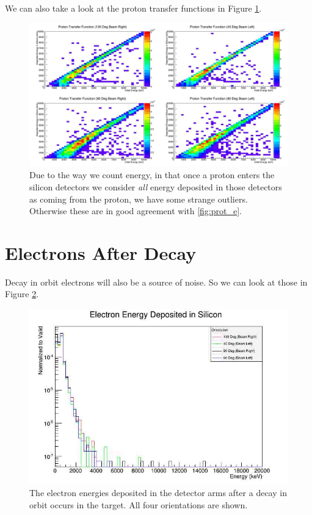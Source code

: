 \documentclass[a4paper]{article}
\begin{document}
We can also take a look at the proton transfer functions in Figure \ref{fig:prottrans}.

\begin{figure}
  \centering
  \includegraphics[scale=0.2]{plots/prot_transfunc}
  \caption{Due to the way we count energy, in that once a proton enters the silicon detectors we
    consider \emph{all} energy deposited in those detectors as coming from the proton, we have some
    strange outliers. Otherwise these are in good agreement with \ref{fig:prot_e}.}
  \label{fig:prottrans}
\end{figure}

\section{Electrons After Decay}
Decay in orbit electrons will also be a source of noise. So we can look at
those in Figure \ref{fig:dio_elec}.

\begin{figure}
  \centering
  \includegraphics[scale=0.5]{plots/elec_e}
  \caption{The electron energies deposited in the detector arms
    after a decay in orbit occurs in the target. All four orientations are
    shown.}
  \label{fig:dio_elec}
\end{figure}
\end{document}
